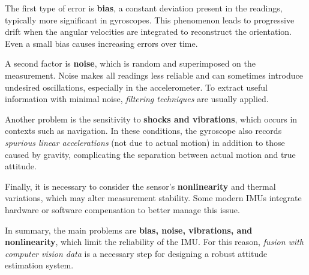 The first type of error is \textbf{bias}, a constant deviation present in the readings, typically more significant in gyroscopes. This phenomenon leads to progressive drift when the angular velocities are integrated to reconstruct the orientation. Even a small bias causes increasing errors over time.

A second factor is \textbf{noise}, which is random and superimposed on the measurement. Noise makes all readings less reliable and can sometimes introduce undesired oscillations, especially in the accelerometer. To extract useful information with minimal noise, \textit{filtering techniques} are usually applied.

Another problem is the sensitivity to \textbf{shocks and vibrations}, which occurs in contexts such as navigation. In these conditions, the gyroscope also records \textit{spurious linear accelerations} (not due to actual motion) in addition to those caused by gravity, complicating the separation between actual motion and true attitude.

Finally, it is necessary to consider the sensor’s \textbf{nonlinearity} and thermal variations, which may alter measurement stability. Some modern IMUs integrate hardware or software compensation to better manage this issue.

In summary, the main problems are \textbf{bias, noise, vibrations, and nonlinearity}, which limit the reliability of the IMU. For this reason, \textit{fusion with computer vision data} is a necessary step for designing a robust attitude estimation system.

